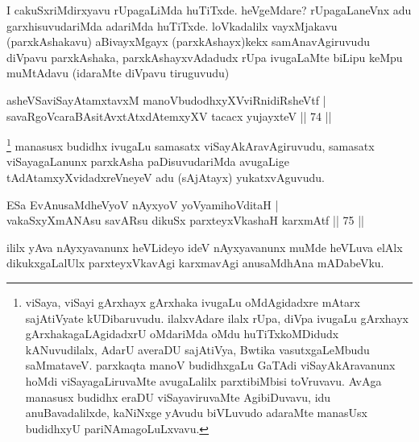 \begin{artha}
I cakuSxriMdirxyavu rUpagaLiMda huTiTxde. heVgeMdare? rUpagaLaneVnx adu garxhisuvudariMda adariMda huTiTxde. loVkadalilx vayxMjakavu (parxkAshakavu) aBivayxMgayx (parxkAshayx)kekx samAnavAgiruvudu diVpavu parxkAshaka, parxkAshayxvAdadudx rUpa ivugaLaMte biLipu keMpu muMtAdavu (idaraMte diVpavu tiruguvudu)
\end{artha}


\begin{shl}
asheVSaviSayAtamxtavxM manoVbudodhxyXVviRnidiRsheVtf |\\
savaRgoVcaraBAsitAvxtAtxdAtemxyXV tacacx yujayxteV \hfill || 74 ||
\end{shl}

\begin{artha}
\footnote{viSaya, viSayi gArxhayx gArxhaka ivugaLu oMdAgidadxre mAtarx sajAtiVyate kUDibaruvudu. ilalxvAdare ilalx rUpa, diVpa ivugaLu gArxhayx gArxhakagaLAgidadxrU oMdariMda oMdu huTiTxkoMDidudx kANuvudilalx, AdarU averaDU sajAtiVya, Bwtika vasutxgaLeMbudu saMmataveV. parxkaqta manoV budidhxgaLu GaTAdi viSayAkAravanunx hoMdi viSayagaLiruvaMte avugaLalilx parxtibiMbisi toVruvavu. AvAga manasusx budidhx eraDU viSayaviruvaMte AgibiDuvavu, idu anuBavadalilxde, kaNiNxge yAvudu biVLuvudo adaraMte manasUsx budidhxyU pariNAmagoLuLxvavu.} manasusx budidhx ivugaLu samasatx viSayAkAravAgiruvudu, samasatx viSayagaLanunx parxkAsha paDisuvudariMda avugaLige tAdAtamxyXvidadxreVneyeV adu (sAjAtayx) yukatxvAguvudu.
\end{artha}


\begin{shl}
ESa EvAnusaMdheVyoV nAyxyoV yoV\s yamihoVditaH |\\
vakaSxyXmANAsu savARsu dikuSx parxteyxVkashaH karxmAtf \hfill || 75 ||
\end{shl}

\begin{artha}
ililx yAva nAyxyavanunx heVLideyo ideV nAyxyavanunx muMde heVLuva elAlx dikukxgaLalUlx parxteyxVkavAgi karxmavAgi anusaMdhAna mADabeVku.
\end{artha}


